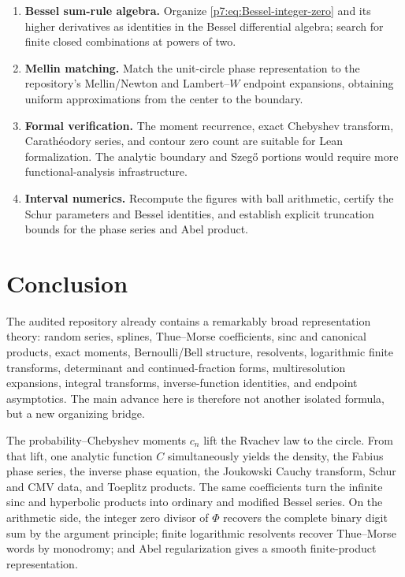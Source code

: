 \documentclass[11pt]{article}
\theoremstyle{definition}
\theoremstyle{remark}
\begin{document}
\begin{enumerate}
\item \textbf{Bessel sum-rule algebra.} Organize \eqref{p7:eq:Bessel-integer-zero} and its
higher derivatives as identities in the Bessel differential algebra; search for finite
closed combinations at powers of two.

\item \textbf{Mellin matching.} Match the unit-circle phase representation to the repository's
Mellin/Newton and Lambert--\(W\) endpoint expansions, obtaining uniform approximations from
the center to the boundary.

\item \textbf{Formal verification.} The moment recurrence, exact Chebyshev transform,
Carath\'eodory series, and contour zero count are suitable for Lean formalization. The
analytic boundary and Szeg\H{o} portions would require more functional-analysis
infrastructure.

\item \textbf{Interval numerics.} Recompute the figures with ball arithmetic, certify the
Schur parameters and Bessel identities, and establish explicit truncation bounds for the
phase series and Abel product.
\end{enumerate}

\section{Conclusion}
\label{p7:sec:conclusion}

The audited repository already contains a remarkably broad representation theory: random
series, splines, Thue--Morse coefficients, sinc and canonical products, exact moments,
Bernoulli/Bell structure, resolvents, logarithmic finite transforms, determinant and
continued-fraction forms, multiresolution expansions, integral transforms, inverse-function
identities, and endpoint asymptotics. The main advance here is therefore not another
isolated formula, but a new organizing bridge.

The probability--Chebyshev moments \(c_n\) lift the Rvachev law to the circle. From that lift,
one analytic function \(C\) simultaneously yields the density, the Fabius phase series, the
inverse phase equation, the Joukowski Cauchy transform, Schur and CMV data, and Toeplitz
products. The same coefficients turn the infinite sinc and hyperbolic products into ordinary
and modified Bessel series. On the arithmetic side, the integer zero divisor of \(\Phi\)
recovers the complete binary digit sum by the argument principle; finite logarithmic
resolvents recover Thue--Morse words by monodromy; and Abel regularization gives a smooth
finite-product representation.
\end{document}
